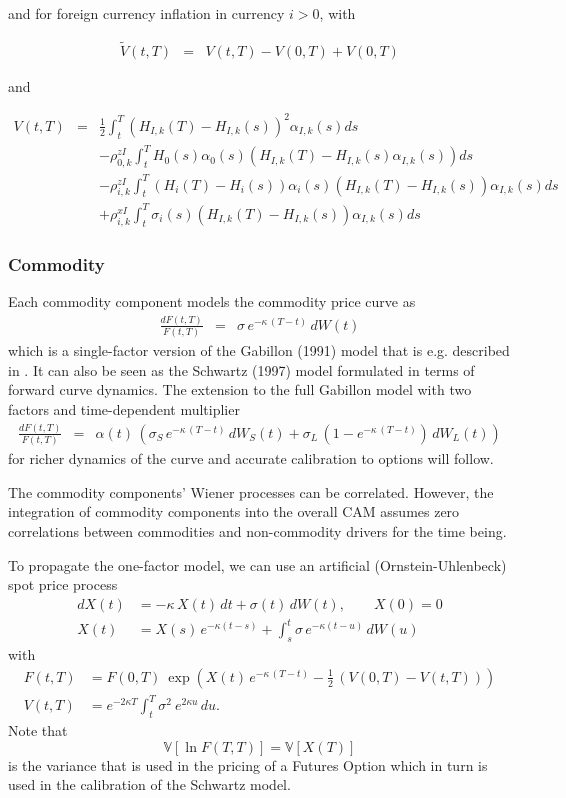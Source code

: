 \documentclass[12pt, a4paper]{article}
\newcommand\V{\ensuremath{\mathbb{V}}}
\begin{document}
{\begin{appendix}
and for foreign currency inflation in currency $i>0$, with

\begin{eqnarray*}
  \tilde{V}(t,T) &=& V(t,T) -V(0,T) + V(0,T)
\end{eqnarray*}

and

\begin{eqnarray*}
  V(t,T) &=& \frac{1}{2}\int_t^T (H_{I,k}(T)-H_{I,k}(s))^2 \alpha_{I,k}(s) ds \\
  & & -\rho^{zI}_{0,k} \int_t^T H_0(s)\alpha_0(s)(H_{I,k}(T)-H_{I,k}(s)\alpha_{I,k}(s)) ds \\
  & & -\rho^{zI}_{i,k} \int_t^T (H_i(T)-H_i(s))\alpha_i(s)(H_{I,k}(T)-H_{I,k}(s))\alpha_{I,k}(s) ds \\
  & & +\rho^{xI}_{i,k} \int_t^T \sigma_i(s)(H_{I,k}(T)-H_{I,k}(s))\alpha_{I,k}(s) ds
\end{eqnarray*}

\subsubsection*{Commodity}

Each commodity component models the commodity price curve as 
\begin{eqnarray}
\frac{dF(t,T)}{F(t,T)} &=& \sigma\,e^{-\kappa\,(T-t)}\, dW(t)  \label{gabillon1f}
\end{eqnarray}
which is a single-factor version of the Gabillon (1991) model that is e.g. described in \cite{Lichters}. It can also be seen as the Schwartz (1997) model formulated in terms of forward curve dynamics. The extension to the full Gabillon model with two factors and time-dependent multiplier
\begin{eqnarray}
\frac{dF(t,T)}{F(t,T)} &=& \alpha(t)\,
\left( \sigma_S \,e^{-\kappa\,(T-t)}\, dW_S(t) + \sigma_L\,\left(1-e^{-\kappa\,(T-t)}\right)\,dW_L(t)\right) \label{gabillon2f}
\end{eqnarray}
for richer dynamics of the curve and accurate calibration to options will follow. 

The commodity components' Wiener processes can be correlated. However, the integration of commodity components into the overall CAM assumes zero correlations between commodities and non-commodity drivers for the time being.

To propagate the one-factor model, we can use an artificial (Ornstein-Uhlenbeck) spot price process
\begin{align*}
dX(t) &= -\kappa\,X(t)\,dt + \sigma(t)\,dW(t), \qquad X(0)=0\\
X(t) &= X(s)\,e^{-\kappa(t-s)}+ \int_s^t \sigma\,e^{-\kappa(t-u)}\, dW(u)
\end{align*}
with 
\begin{align*}
F(t,T) &= F(0,T) \:\exp\left( X(t)\,e^{-\kappa\,(T-t)} - \frac{1}{2}\,(V(0,T)-V(t,T))  \right) \\
V(t,T) &= e^{-2\kappa T}\int_t^T\sigma^2\:e^{2\kappa u}\,du.
\end{align*}
Note that 
$$
\V[\ln F(T,T)] = \V[X(T)] 
$$
is the variance that is used in the pricing of a Futures Option which in turn is used in the calibration of the Schwartz model.


\end{appendix}}
\end{document}
